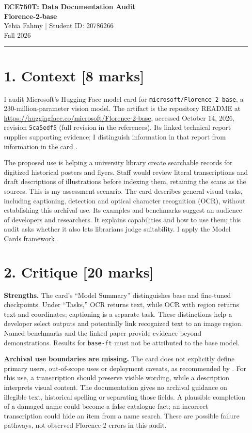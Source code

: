 \documentclass[11pt,letterpaper]{article}
\begin{document}
{\Large\textbf{ECE750T: Data Documentation Audit}}\\[5pt]
{\large\textbf{Florence-2-base}}\\[4pt]
Yehia Fahmy \quad | \quad Student ID: 20786266\\
Fall 2026
\vspace{0.5em}\hrule\vspace{0.5em}

\section*{1. Context [8 marks]}
I audit Microsoft's Hugging Face model card for \texttt{microsoft/Florence-2-base}, a 230-million-parameter vision model. The artifact is the repository README at \url{https://huggingface.co/microsoft/Florence-2-base}, accessed October 14, 2026, revision \texttt{5ca5edf5} (full revision in the references). Its linked technical report supplies supporting evidence; I distinguish information in that report from information in the card \citep{microsoftCard,xiao2023}.

The proposed use is helping a university library create searchable records for digitized historical posters and flyers. Staff would review literal transcriptions and draft descriptions of illustrations before indexing them, retaining the scans as the sources. This is my assessment scenario. The card describes general visual tasks, including captioning, detection and optical character recognition (OCR), without establishing this archival use. Its examples and benchmarks suggest an audience of developers and researchers. It explains capabilities and how to use them; this audit asks whether it also lets librarians judge suitability. I apply the Model Cards framework \citep{mitchell2019}.

\section*{2. Critique [20 marks]}
\textbf{Strengths.} The card's ``Model Summary'' distinguishes base and fine-tuned checkpoints. Under ``Tasks,'' OCR returns text, while OCR with region returns text and coordinates; captioning is a separate task. These distinctions help a developer select outputs and potentially link recognized text to an image region. Named benchmarks and the linked paper provide evidence beyond demonstrations. Results for \texttt{base-ft} must not be attributed to the base model.

\textbf{Archival use boundaries are missing.} The card does not explicitly define primary users, out-of-scope uses or deployment caveats, as recommended by \citet[\S\S4.2, 4.8--4.9]{mitchell2019}. For this use, a transcription should preserve visible wording, while a description interprets visual content. The documentation gives no archival guidance on illegible text, historical spelling or separating those fields. A plausible completion of a damaged name could become a false catalogue fact; an incorrect transcription could hide an item from a name search. These are possible failure pathways, not observed Florence-2 errors in this audit.
\end{document}
